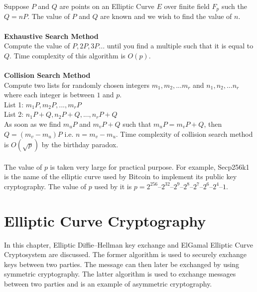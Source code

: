 \documentclass[a4paper,12pt]{report}
\begin{document}
Suppose  $P$ and $Q$ are points on an Elliptic Curve $E$ over finite field $F_p$ such the $Q=nP$. The value of $P$ and $Q$ are known and we wish to find the value of $n$.\\\\
\textbf{Exhaustive Search Method}\\
Compute the value of $P,2P,3P...$ until you find a multiple such that it is equal to $Q$. Time complexity of this algorithm is $O(p)$.\\\\
\textbf{Collision Search Method}\\
Compute two lists for randomly chosen integers $m_1, m_2, . . .m_r$ and $n_1, n_2, . . .n_r$ where each integer is between $1$ and $p$.\\
List 1: $m_1 P, m_2 P, . . .,m_r P$\\
List 2: $n_1 P + Q, n_2 P + Q, . . ., n_r P + Q$\\
As soon as we find $m_u P$ and $m_v P + Q$ such that $m_u P = m_v P + Q$, then $Q = (m_v - m_u) P $ i.e. $n=m_v - m_u$. Time complexity of collision search method is $O(\sqrt{p})$ by the birthday paradox\cite{hoffstein2008introduction}.\\\\
The value of $p$ is taken very large for practical purpose. For example, Secp256k1 is the name of the elliptic curve used by Bitcoin to implement its public key cryptography. The value of $p$ used by it is $p = 2^{256} – 2^{32} – 2^9 – 2^8 – 2^7 – 2^6 – 2^4 – 1$.
\cleardoublepage
\chapter{Elliptic Curve Cryptography}
In this chapter, Elliptic Diﬃe–Hellman key exchange and ElGamal Elliptic Curve Cryptosystem are discussed. The former algorithm is used to securely exchange keys between two parties. The message can then later be exchanged by using symmetric cryptography. The latter algorithm is used to exchange messages between two parties and is an example of asymmetric cryptography. 
\end{document}
